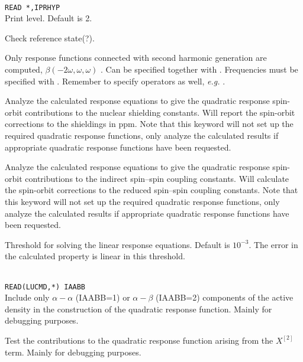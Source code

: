 \begin{description}
\item{}\\
\verb|READ *,IPRHYP|\\
Print level. Default is 2.

\item{} Check reference state(?).

\item{}
Only response functions connected with second harmonic
generation
are computed, $\beta(-2\omega,\omega,\omega)$ .
Can be specified together with .
Frequencies must be specified with .
Remember to specify operators as well, {\it e.g.\/} .

\item{}
Analyze the calculated response equations to give the quadratic
response spin-orbit contributions to the nuclear shielding
constants. Will report the spin-orbit corrections to the shieldings in
ppm. Note that this keyword will not set up the required quadratic
response functions, only analyze the calculated results if appropriate
quadratic response functions have been requested.

\item{}
Analyze the calculated response equations to give the quadratic
response spin-orbit contributions to the indirect spin--spin coupling
constants. Will calculate the spin-orbit corrections to the reduced spin--spin
coupling constants. Note that this keyword will not set up the
required quadratic
response functions, only analyze the calculated results if appropriate
quadratic response functions have been requested.

\item{}
Threshold for solving the linear response equations.
Default is $10^{-3}$. The error in the calculated property is linear
in this threshold.

\item{}\\
\verb|READ(LUCMD,*) IAABB|\\
Include only $\alpha-\alpha$ (IAABB=1) or $\alpha-\beta$ (IAABB=2)
components of the active density in the construction of the quadratic
response function. Mainly for debugging purposes.

\item{}
Test the contributions to the quadratic response function arising from
the $X^{\left[2\right]}$ term. Mainly for debugging purposes.

\end{description}

